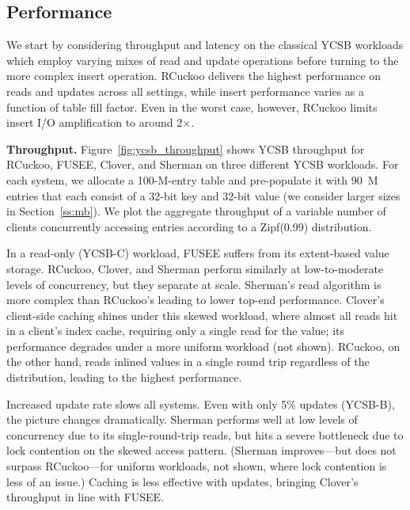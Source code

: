 


\subsection{Performance}

We start by considering throughput and latency on the classical YCSB
workloads which employ varying mixes of read and update operations
before turning to the more complex insert operation.  RCuckoo delivers
the highest performance on reads and updates across all settings,
while insert performance varies as a function of table fill factor.
Even in the worst case, however, RCuckoo limits insert I/O amplification to
around 2$\times$.

\textbf{Throughput.} Figure~\ref{fig:ycsb_throughput} shows YCSB
throughput for RCuckoo, FUSEE, Clover, and Sherman on three different
YCSB workloads. For each system, we allocate a 100-M-entry table and
pre-populate it with 90~M entries that each consist of a 32-bit key
and 32-bit value (we consider larger sizes in Section~\ref{ss:mb}).
We plot the aggregate throughput of a variable number of clients
concurrently accessing entries according to a Zipf(0.99) distribution.

In a read-only (YCSB-C) workload, FUSEE suffers from its extent-based
value storage.  RCuckoo, Clover, and Sherman perform similarly at
low-to-moderate levels of concurrency, but they separate at scale.
Sherman's read algorithm is more complex than RCuckoo's leading to
lower top-end performance.  Clover's client-side caching shines under
this skewed workload, where almost all reads hit in a client's index
cache, requiring only a single read for the value; its performance
degrades under a more uniform workload (not shown).  RCuckoo, on the
other hand, reads inlined values in a single round trip
regardless of the distribution, leading to the highest performance.


Increased update rate slows all systems.  Even with only 5\% updates (YCSB-B), the picture changes
dramatically.  Sherman performs well at low levels of concurrency due to its single-round-trip
reads, but hits a severe bottleneck due to lock contention on the skewed access pattern.  (Sherman
improves---but does not surpass RCuckoo---for uniform workloads, not shown, where lock contention is
less of an issue.) Caching is less effective with updates, bringing Clover's throughput in line with
FUSEE.


